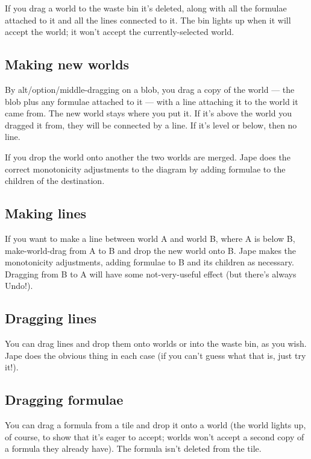 \documentclass[11pt]{book}
\begin{document}
If you drag a world to the waste bin it's deleted, along with all the formulae attached to it and all the lines connected to it. The bin lights up when it will accept the world; it won't accept the currently-selected world.

\subsection{Making new worlds}

By alt/option/middle-dragging on a blob, you drag a copy of the world --- the blob plus any formulae attached to it --- with a line attaching it to the world it came from. The new world stays where you put it. If it's above the world you dragged it from, they will be connected by a line. If it's level or below, then no line.

If you drop the world onto another the two worlds are merged. Jape does the correct monotonicity adjustments to the diagram by adding formulae to the children of the destination.

\subsection{Making lines}

If you want to make a line between world A and world B, where A is below B, make-world-drag from A to B and drop the new world onto B. Jape makes the monotonicity adjustments, adding formulae to B and its children as necessary. Dragging from B to A will have some not-very-useful effect (but there's always Undo!).

\subsection{Dragging lines}

You can drag lines and drop them onto worlds or into the waste bin, as you wish. Jape does the obvious thing in each case (if you can't guess what that is, just try it!).

\subsection{Dragging formulae}

You can drag a formula from a tile and drop it onto a world (the world lights up, of course, to show that it's eager to accept; worlds won't accept a second copy of a formula they already have). The formula isn't deleted from the tile.
\end{document}
